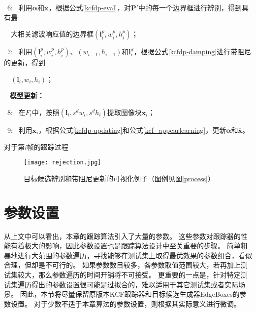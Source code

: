 \begin{algorithm}[htb]
\begin{flushleft}
		{{} \ 6: \ 利用$\boldsymbol{\alpha}$和$\overline{\mathbf{x}}$，根据公式\ref{kcfdp-eval}，对$\mathbf{P}'$中的每一个边界框进行辨别，得到具有最}{\small \par}
		{\quad{}\ \ }{大相关滤波响应值的边界框$(\mathbf{l}^p_{i}, w^p_{i}, h^p_{i})$；}{\small \par}
		{{} \ 7: \ 利用$(\mathbf{l}^p_{i}, w^p_{i}, h^p_{i})$、$(w_{i-1}, h_{i-1})$和$\mathbf{l}^d_{i}$，根据公式\ref{kcfdp-damping}进行带阻尼的更新，得到}{\small \par}
		{\quad{}\ \ }{$(\mathbf{l}_{i}, w_{i}, h_{i})$；}{\small \par}
		\vspace{0.1in}
		{\quad{}\ }{{} \textbf{模型更新：}}{\small \par}
		{{} \ 8: \ 在$F_i$中，按照$(\mathbf{l}_{i}, s^dw_{i}, s^dh_{i})$提取图像块$\mathbf{x}_i$；}{\small \par}
		{{} \ 9: \ 利用$\mathbf{x}_i$，根据公式\ref{kcfdp-updating}和公式\ref{kcf_appearlearning}，更新$\boldsymbol{\alpha}$和$\overline{\mathbf{x}}$。}
	\end{flushleft}
	\caption{对于第$i$帧的跟踪过程}
	\label{algorithm}
\end{algorithm}

\begin{figure}[htb]
	\centering
		\texttt{[image: rejection.jpg]}
	\caption{目标候选辨别和带阻尼更新的可视化例子（图例见图\ref{process}）}
	\label{rejection}
\end{figure}

\section{参数设置}
\label{param_setup}
从上文中可以看出，本章的跟踪算法引入了大量的参数。
这些参数对跟踪器的性能有着极大的影响，因此参数设置也是跟踪算法设计中至关重要的步骤。
简单粗暴地进行大范围的参数遍历，寻找能够在测试集上取得最优效果的参数组合，看似合理，但却是不可行的。
如果参数数目较多，各参数取值范围较大，若再加上测试集较大，那么参数遍历的时间开销将不可接受。
更重要的一点是，针对特定测试集遍历得出的参数设置很可能是过拟合的，难以适用于其它测试集或者实际场景。
因此，本节将尽量保留原版本KCF跟踪器和目标候选生成器EdgeBoxes的参数设置。
对于少数不适于本章算法的参数设置，则根据其实际意义进行微调。


